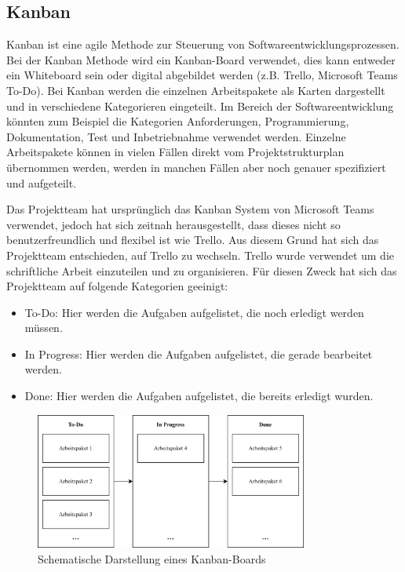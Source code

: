 \subsection{Kanban}

Kanban ist eine agile Methode zur Steuerung von Softwareentwicklungsprozessen. Bei der Kanban Methode wird ein Kanban-Board verwendet, dies kann entweder ein Whiteboard sein oder digital abgebildet werden (z.B. Trello, Microsoft Teams To-Do). Bei Kanban werden die einzelnen Arbeitspakete als Karten dargestellt und in verschiedene Kategorieren eingeteilt. Im Bereich der Softwareentwicklung könnten zum Beispiel die Kategorien Anforderungen, Programmierung, Dokumentation, Test und Inbetriebnahme verwendet werden. Einzelne Arbeitspakete können in vielen Fällen direkt vom Projektstrukturplan übernommen werden, werden in manchen Fällen aber noch genauer spezifiziert und aufgeteilt. 

Das Projektteam hat ursprünglich das Kanban System von Microsoft Teams verwendet, jedoch hat sich zeitnah herausgestellt, dass dieses nicht so benutzerfreundlich und flexibel ist wie Trello. Aus diesem Grund hat sich das Projektteam entschieden, auf Trello zu wechseln. Trello wurde verwendet um die schriftliche Arbeit einzuteilen und zu organisieren. Für diesen Zweck hat sich das Projektteam auf folgende Kategorien geeinigt:
\begin{itemize}
    \item To-Do: Hier werden die Aufgaben aufgelistet, die noch erledigt werden müssen.
    \item In Progress: Hier werden die Aufgaben aufgelistet, die gerade bearbeitet werden.
    \item Done: Hier werden die Aufgaben aufgelistet, die bereits erledigt wurden.
\end{itemize}

\begin{figure}[H]
    \centering
    \includegraphics[width=0.8\textwidth]{images/kanban.png}
    \caption{Schematische Darstellung eines Kanban-Boards}
    \label{fig:kanban}
\end{figure}

